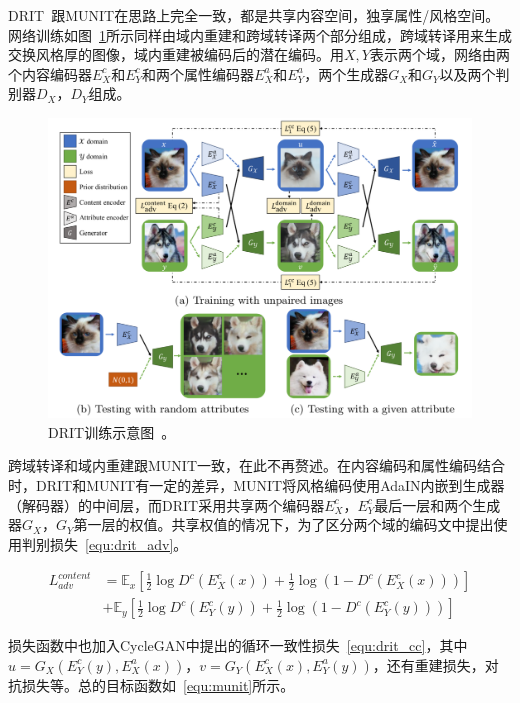DRIT~\cite{lee2018diverse}跟MUNIT在思路上完全一致，都是共享内容空间，独享属性/风格空间。网络训练如图~\ref{fig:drit}所示同样由域内重建和跨域转译两个部分组成，跨域转译用来生成交换风格厚的图像，域内重建被编码后的潜在编码。用$X, Y$表示两个域，网络由两个内容编码器$E_{X}^{c}$和$E_{Y}^{c}$和两个属性编码器$E_{X}^{a}$和$E_{Y}^{a}$，两个生成器$G_X$和$G_Y$以及两个判别器$D_X$，$D_Y$组成。

\begin{figure}[ht]
    \centering
	\includegraphics[width=\textwidth]{figures/DRIT.pdf}
	\caption{DRIT训练示意图~\cite{lee2018diverse}。}
	\label{fig:drit}
\end{figure}

跨域转译和域内重建跟MUNIT一致，在此不再赘述。在内容编码和属性编码结合时，DRIT和MUNIT有一定的差异，MUNIT将风格编码使用AdaIN内嵌到生成器（解码器）的中间层，而DRIT采用共享两个编码器$E_X^c$，$E_Y^c$最后一层和两个生成器$G_X$，$G_Y$第一层的权值。共享权值的情况下，为了区分两个域的编码文中提出使用判别损失~\ref{equ:drit_adv}。

\begin{equation}
\label{equ:drit_adv}
\begin{aligned}
L_{adv}^{content} & = \mathbb{E}_x[\frac{1}{2}\log D^c(E_X^c(x))+\frac{1}{2}\log(1-D^c(E_X^c(x)))] \\
& + \mathbb{E}_y[\frac{1}{2}\log D^c(E_Y^c(y))+\frac{1}{2}\log(1-D^c(E_Y^c(y)))] 
\end{aligned}
\end{equation}

损失函数中也加入CycleGAN中提出的循环一致性损失~\ref{equ:drit_cc}，其中$u=G_X(E_Y^c(y),E_X^a(x))$，$v=G_Y(E_X^c(x),E_Y^a(y))$，还有重建损失，对抗损失等。总的目标函数如~\ref{equ:munit}所示。

